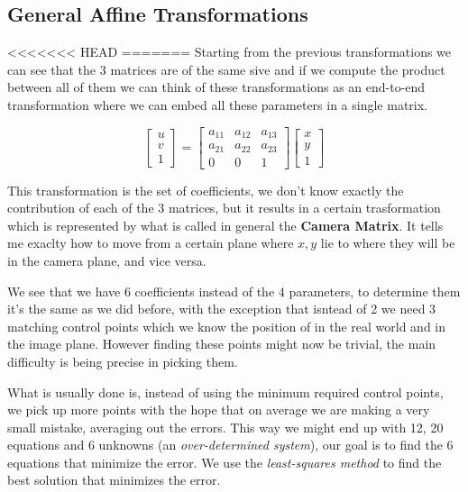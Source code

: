 \subsection{General Affine Transformations}

<<<<<<< HEAD
=======
Starting from the previous transformations we can see that the 3 matrices are of the same sive and if we compute the product between all of them we can think of these transformations as an end-to-end transformation where we can embed all these parameters in a single matrix.

\[
    \begin{bmatrix}
    u \\
    v \\
    1
    \end{bmatrix}
    =
    \begin{bmatrix}
    a_{11} & a_{12} & a_{13} \\
    a_{21} & a_{22} & a_{23} \\
    0 & 0 & 1
    \end{bmatrix}
    \begin{bmatrix}
        x \\
        y \\
        1
    \end{bmatrix}
\]

This transformation is the set of coefficients, we don't know exactly the contribution of each of the 3 matrices, but it results in a certain trasformation which is represented by what is called in general the \textbf{Camera Matrix}. It tells me exaclty how to move from a certain plane where \(x, y\) lie to where they will be in the camera plane, and vice versa.

We see that we have 6 coefficients instead of the 4 parameters, to determine them it's the same as we did before, with the exception that isntead of 2 we need 3 matching control points which we know the position of in the real world and in the image plane. However finding these points might now be trivial,
the main difficulty is being precise in picking them.

What is usually done is, instead of using the minimum required control points, we pick up more points with the hope that on average we are making a very small mistake, averaging out the errors. This way we might end up with 12, 20 equations and 6 unknowns (an \textit{over-determined system}), our goal is to find the 6 equations that minimize the error. We use the \textit{least-squares method} to find the best solution that minimizes the error.


